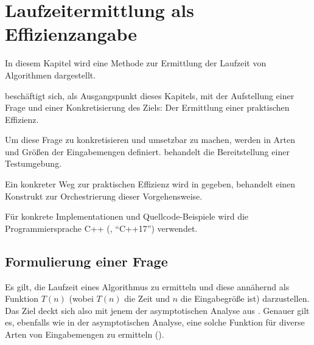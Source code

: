 \chapter{Laufzeitermittlung als Effizienzangabe}
\label{cha:praktische-effizienz}

In diesem Kapitel wird eine Methode zur Ermittlung der Laufzeit von Algorithmen dargestellt.

 beschäftigt sich, als Ausgangspunkt dieses Kapitels, mit der Aufstellung einer Frage und einer Konkretisierung des Ziels: Der Ermittlung einer praktischen Effizienz.

Um diese Frage zu konkretisieren und umsetzbar zu machen, werden in  Arten und Größen der Eingabemengen definiert.  behandelt die Bereitstellung einer Testumgebung.

Ein konkreter Weg zur praktischen Effizienz wird in  gegeben,  behandelt einen Konstrukt zur Orchestrierung dieser Vorgehensweise.

Für konkrete Implementationen und Quellcode-Beispiele wird die Programmiersprache C++ (\cite{ISO-C++17}, \enquote{C++17}) verwendet.


\section{Formulierung einer Frage}
\label{sec:runtime-question}

Es gilt, die Laufzeit eines Algorithmus zu ermitteln und diese annähernd als Funktion $T(n)$ (wobei $T(n)$ die Zeit und $n$ die Eingabegröße ist) darzustellen. Das Ziel deckt sich also mit jenem der asymptotischen Analyse aus . Genauer gilt es, ebenfalls wie in der asymptotischen Analyse, eine solche Funktion für diverse Arten von Eingabemengen zu ermitteln (\cite[27]{mcg2012}).

